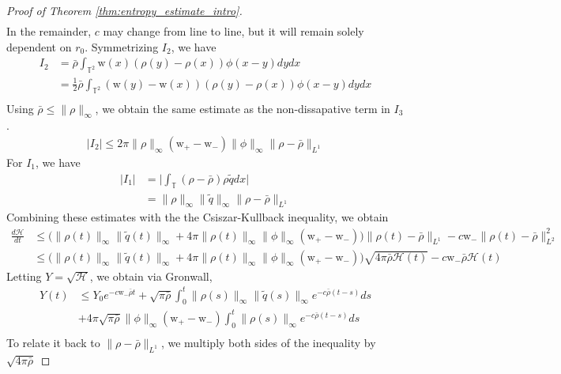 \documentclass[11pt,letterpaper]{amsart}
\theoremstyle{plain}
\theoremstyle{definition}
\theoremstyle{remark}
\newcommand{\T}{\ensuremath{\mathbb{T}}}   %
\def \cH {\mathcal{H}}
\renewcommand{\leq}{\leqslant}
\def\T{\mathbb{T}}
\def \wt {\mathrm{w}}
\begin{document}
\begin{proof}[Proof of Theorem \ref{thm:entropy_estimate_intro}]
\begin{align*}
    \end{align*}
    In the remainder, $c$ may change from line to line, but it will remain solely dependent on $r_0$. Symmetrizing $I_2$, we have
    \begin{align*}
        I_2 &= \bar{\rho}  \int_{\T^2} \wt(x) (\rho(y) - \rho(x)) \phi(x-y) dy dx \\
            &= \frac{1}{2} \bar{\rho}  \int_{\T^2} (\wt(y) - \wt(x)) (\rho(y) - \rho(x)) \phi(x-y) dy dx \\
    \end{align*} 
    Using $\bar{\rho} \leq \|\rho\|_{\infty}$, we obtain the same estimate as the non-dissapative term in $I_3$.
    \begin{align*}
        |I_2| \leq 2\pi \|\rho\|_{\infty} (\wt_+ - \wt_-) \|\phi\|_{\infty} \|\rho - \bar{\rho}\|_{L^1} 
    \end{align*}
    For $I_1$, we have 
    \begin{align*}
        |I_1| &= \big| \int_{\T} (\rho - \bar{\rho}) \rho \tilde{q} dx \big| \\
              &= \|\rho\|_{\infty} \|\tilde{q}\|_{\infty} \|\rho - \bar{\rho}\|_{L^1}
    \end{align*}
    Combining these estimates with the the Csiszar-Kullback inequality, we obtain 
    \begin{align*}
        \frac{d \cH}{dt} 
            &\leq \Big( \|\rho(t)\|_{\infty} \|\tilde{q}(t)\|_{\infty} + 4\pi \|\rho(t)\|_{\infty} \|\phi\|_{\infty} (\wt_+ - \wt_-) \Big) \|\rho(t) - \bar{\rho}\|_{L^1} - c \wt_- \|\rho(t) - \bar{\rho}\|_{L^2}^2 \\
            &\leq \Big( \|\rho(t)\|_{\infty} \|\tilde{q}(t)\|_{\infty} + 4\pi \|\rho(t)\|_{\infty} \|\phi\|_{\infty} (\wt_+ - \wt_-) \Big) \sqrt{4 \pi \bar{\rho} \cH(t)} - c \wt_- \bar{\rho} \cH(t)  
    \end{align*}
    Letting $Y = \sqrt{\cH}$, we obtain via Gronwall,   
    \begin{align*}
        Y(t) &\leq Y_0 e^{-c \wt_- \bar{\rho}t}  
        + \sqrt{\pi \bar{\rho}} \int_0^t  \|\rho(s)\|_{\infty} \|\tilde{q}(s)\|_{\infty}  e^{-c \bar{\rho}(t-s)} ds  \\       
        &+ 4\pi \sqrt{\pi \bar{\rho}} \|\phi\|_{\infty} (\wt_+ - \wt_-) \int_0^t  \|\rho(s)\|_{\infty}  e^{-c \bar{\rho}(t-s)} ds  \\       
    \end{align*}
    To relate it back to $\|\rho - \bar{\rho}\|_{L^1}$, we multiply both sides of the inequality by $\sqrt{4\pi \bar{\rho}}$ 

\end{proof}
\end{document}
